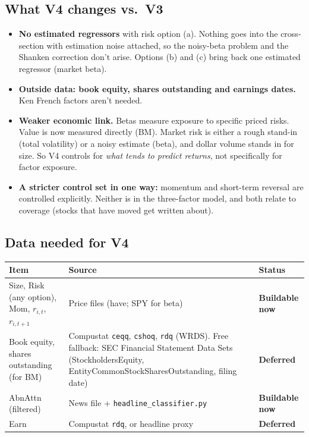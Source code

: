 \documentclass[11pt]{article}
\newcommand{\canbuild}{\textcolor{TealBlue}{\textbf{Buildable now}}}
\newcommand{\dl}{\textcolor{BurntOrange}{\textbf{Deferred}}}
\newcommand{\var}[1]{\texttt{#1}}
\begin{document}
\subsection*{What V4 changes vs.\ V3}
\begin{itemize}
  \item \textbf{No estimated regressors} with risk option (a). Nothing goes into the cross-section with estimation noise attached, so the noisy-beta problem and the Shanken correction don't arise. Options (b) and (c) bring back one estimated regressor (market beta).
  \item \textbf{Outside data: book equity, shares outstanding and earnings dates.} Ken French factors aren't needed.
  \item \textbf{Weaker economic link.} Betas measure exposure to specific priced risks. Value is now measured directly (BM). Market risk is either a rough stand-in (total volatility) or a noisy estimate (beta), and dollar volume stands in for size. So V4 controls for \emph{what tends to predict returns}, not specifically for factor exposure.
  \item \textbf{A stricter control set in one way:} momentum and short-term reversal are controlled explicitly. Neither is in the three-factor model, and both relate to coverage (stocks that have moved get written about).
\end{itemize}

\subsection*{Data needed for V4}
\begin{center}\small
\begin{tabularx}{\textwidth}{>{\raggedright}p{3.6cm} >{\raggedright}X p{2.4cm}}
\toprule
Item & Source & Status\\
\midrule
Size, Risk (any option), Mom, $r_{i,t}$, $r_{i,t+1}$ & Price files (have; SPY for beta) & \canbuild\\
Book equity, shares outstanding (for BM) & Compustat \var{ceqq}, \var{cshoq}, \var{rdq} (WRDS). Free fallback: SEC Financial Statement Data Sets (StockholdersEquity, EntityCommonStockSharesOutstanding, filing date) & \dl\\
AbnAttn (filtered) & News file + \var{headline\_classifier.py} & \canbuild\\
Earn & Compustat \var{rdq}, or headline proxy & \dl\\
\bottomrule
\end{tabularx}
\end{center}
\end{document}
